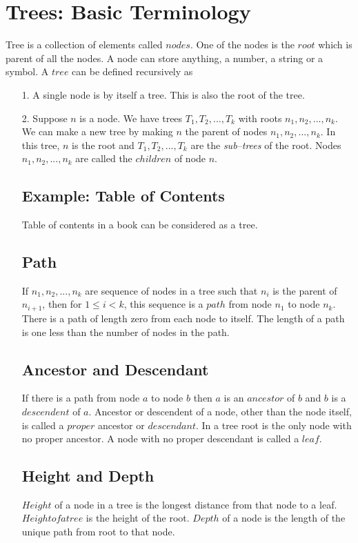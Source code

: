 \documentclass[12pt,a4paper]{article}
\begin{document}
\section{Trees: Basic Terminology~\cite[Sec. 3.1]{Aho}}
Tree is a collection of elements called $nodes$. One of the nodes is the $root$ which is parent of all the nodes. A node can store anything, a number, a string or a symbol. A $tree$ can be defined recursively as
\begin{itemize}
\item[1.] A single node is by itself a tree. This is also the root of the tree.
\item[2.] Suppose $n$ is a node. We have trees $T_1, T_2,..., T_k$ with roots $n_1, n_2,..., n_k$. We can make a new tree by making $n$ the parent of nodes $n_1, n_2,..., n_k$. In this tree, $n$ is the root and $T_1, T_2,..., T_k$ are the \textit{sub--trees} of the root. Nodes $n_1, n_2,..., n_k$ are called the $children$ of node $n$.
\subsection{Example: Table of Contents}
Table of contents in a book can be considered as a tree.
\subsection{Path}
If $n_1, n_2,..., n_k$ are sequence of nodes in a tree such that $n_i$ is the parent of $n_{i+1}$, then for $1\leq i<k$, this sequence is a $path$ from node $n_1$ to node $n_k$. There is a path of length zero from each node to itself. The length of a path is one less than the number of nodes in the path.
\subsection{Ancestor and Descendant}
If there is a path from node $a$ to node $b$ then $a$ is an $ancestor$ of $b$ and $b$ is a $descendent$ of $a$. Ancestor or descendent of a node, other than the node itself, is called a $proper$ ancestor or $descendant$. In a tree root is the only node with no proper ancestor. A node with no proper descendant is called a $leaf$.
\subsection{Height and Depth}
$Height$ of a node in a tree is the longest distance from that node to a leaf. $Height of a tree$ is the height of the root. $Depth$ of a node is the length of the unique path from root to that node.

\end{itemize}
\end{document}
